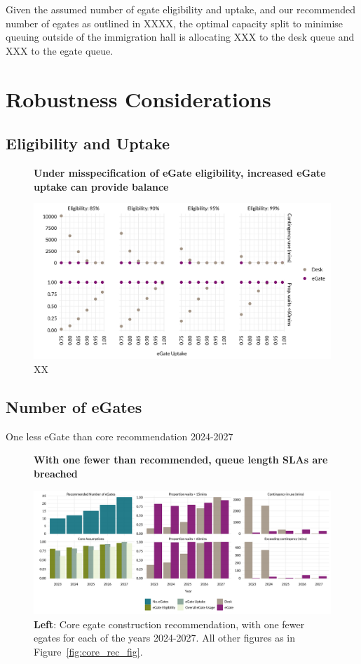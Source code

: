 \documentclass[10pt]{article}
\newcommand*{\figuretitle}[1]{%
    {\centering%
    \textbf{#1}%
    \par\medskip}%
}
\begin{document}
Given the assumed number of \gls{egate} eligibility and uptake, and our recommended number of \glspl{egate} as outlined in XXXX, the optimal capacity split to minimise queuing outside of the immigration hall is allocating XXX to the desk queue and XXX to the \gls{egate} queue.
 

\section{Robustness Considerations} \label{sec:robustness}

\subsection{Eligibility and Uptake}

\begin{figure}[!ht]
    \centering
    \figuretitle{Under misspecification of eGate eligibility, increased eGate uptake can provide balance}
    \includegraphics[width=\textwidth]{figures/robustness_fig.png}
     \caption{XX} \label{fig:robustness_fig}
\end{figure}

\subsection{Number of eGates}
One less eGate than core recommendation 2024-2027
\begin{figure}[!ht]
    \centering
    \figuretitle{With one fewer than recommended, queue length SLAs are breached}
    \includegraphics[width=\textwidth]{figures/minus_core_rec_fig.png}
     \caption{\textbf{Left}: Core \gls{egate} construction recommendation, with one fewer \glspl{egate} for each of the years 2024-2027. All other figures as in Figure~\ref{fig:core_rec_fig}.} \label{fig:minus_core_rec_fig}
\end{figure}
\end{document}
